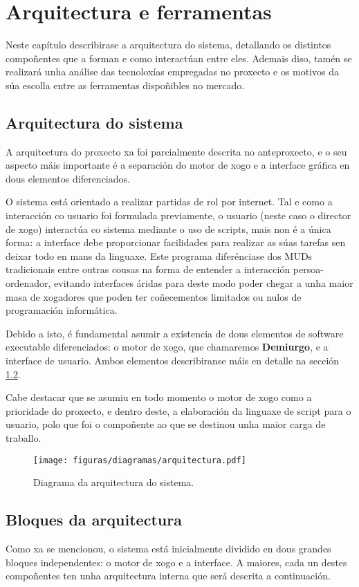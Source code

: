 \chapter{Arquitectura e ferramentas}
Neste capítulo describirase a arquitectura do sistema, detallando os distintos
compoñentes que a forman e como interactúan entre eles. Ademais diso, tamén se
realizará unha análise das tecnoloxías empregadas no proxecto e os motivos da
súa escolla entre as ferramentas dispoñibles no mercado.

\section{Arquitectura do sistema}
A arquitectura do proxecto xa foi parcialmente descrita no anteproxecto, e o
seu aspecto máis importante é a separación do motor de xogo e a interface
gráfica en dous elementos diferenciados.
\par
O sistema está orientado a realizar partidas de rol por internet. Tal e como
a interacción co usuario foi formulada previamente, o usuario (neste caso o
director de xogo) interactúa co sistema mediante o uso de scripts, mais non é a
única forma: a interface debe proporcionar facilidades para realizar as súas
tarefas sen deixar todo en mans da linguaxe. Este programa diferénciase dos MUDs
tradicionais entre outras cousas na forma de entender a interacción
persoa-ordenador, evitando interfaces áridas para deste modo poder chegar a unha
maior masa de xogadores que poden ter coñecementos limitados ou nulos de
programación informática.
\par
Debido a isto, é fundamental asumir a existencia de dous elementos de software
executable diferenciados: o motor de xogo, que chamaremos \textbf{Demiurgo}, e a
interface de usuario. Ambos elementos describiranse máis en detalle na sección
\ref{sec:bloques}.
\par
Cabe destacar que se asumiu en todo momento o motor de xogo como a prioridade do
proxecto, e dentro deste, a elaboración da linguaxe de script para o usuario,
polo que foi o compoñente ao que se destinou unha maior carga de traballo.
\begin{figure}
\centerline{\texttt{[image: figuras/diagramas/arquitectura.pdf]}}
\caption{Diagrama da arquitectura do sistema.}
\label{fig:arquitectura}
\end{figure}

\section{Bloques da arquitectura}
\label{sec:bloques}
Como xa se mencionou, o sistema está inicialmente dividido en dous grandes
bloques independentes: o motor de xogo e a interface. A maiores, cada un destes
compoñentes ten unha arquitectura interna que será descrita a continuación.

